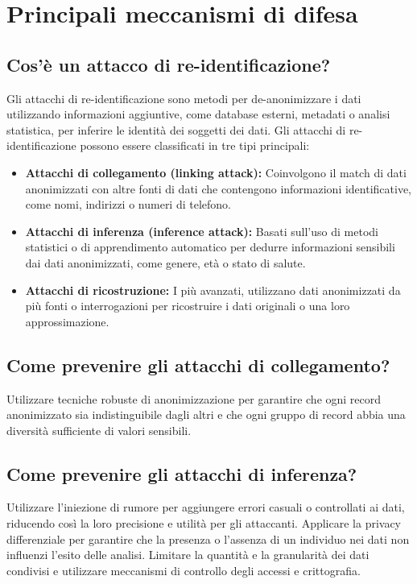 \chapter{Principali meccanismi di difesa}

\section{Cos'è un attacco di re-identificazione?}

Gli attacchi di re-identificazione sono metodi per de-anonimizzare i dati utilizzando informazioni aggiuntive, come database esterni, metadati o analisi statistica, per inferire le identità dei soggetti dei dati. Gli attacchi di re-identificazione possono essere classificati in tre tipi principali:

\begin{itemize}
    \item \textbf{Attacchi di collegamento (linking attack):} Coinvolgono il match di dati anonimizzati con altre fonti di dati che contengono informazioni identificative, come nomi, indirizzi o numeri di telefono.
    \item \textbf{Attacchi di inferenza (inference attack):} Basati sull'uso di metodi statistici o di apprendimento automatico per dedurre informazioni sensibili dai dati anonimizzati, come genere, età o stato di salute.
    \item \textbf{Attacchi di ricostruzione:} I più avanzati, utilizzano dati anonimizzati da più fonti o interrogazioni per ricostruire i dati originali o una loro approssimazione.
\end{itemize}

\section{Come prevenire gli attacchi di collegamento?}

Utilizzare tecniche robuste di anonimizzazione per garantire che ogni record anonimizzato sia indistinguibile dagli altri e che ogni gruppo di record abbia una diversità sufficiente di valori sensibili.

\section{Come prevenire gli attacchi di inferenza?}

Utilizzare l'iniezione di rumore per aggiungere errori casuali o controllati ai dati, riducendo così la loro precisione e utilità per gli attaccanti. Applicare la privacy differenziale per garantire che la presenza o l'assenza di un individuo nei dati non influenzi l'esito delle analisi. Limitare la quantità e la granularità dei dati condivisi e utilizzare meccanismi di controllo degli accessi e crittografia.

